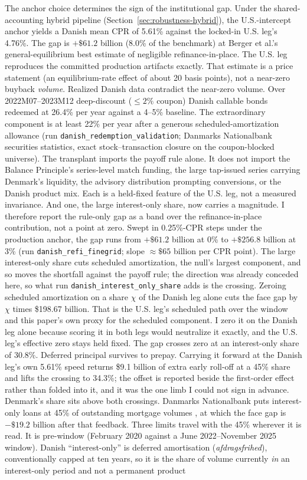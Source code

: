 \documentclass[12pt]{article}
\begin{document}
The anchor choice determines the sign of the institutional gap. Under the shared-accounting hybrid pipeline (Section~\ref{sec:robustness-hybrid}), the U.S.-intercept anchor yields a Danish mean CPR of 5.61\% against the locked-in U.S. leg's 4.76\%. The gap is $+\$61.2$ billion (8.0\% of the benchmark) at Berger et al.'s general-equilibrium best estimate of negligible refinance-in-place. The U.S. leg reproduces the committed production artifacts exactly. That estimate is a price statement (an equilibrium-rate effect of about 20 basis points), not a near-zero buyback \emph{volume}. Realized Danish data contradict the near-zero volume. Over 2022M07--2023M12 deep-discount ($\leq 2\%$ coupon) Danish callable bonds redeemed at 26.4\% per year against a 4--5\% baseline. The extraordinary component is at least 22\% per year after a generous scheduled-amortization allowance (run \texttt{danish\_redemption\_validation}; Danmarks Nationalbank securities statistics, exact stock--transaction closure on the coupon-blocked universe). The transplant imports the payoff rule alone. It does not import the Balance Principle's series-level match funding, the large tap-issued series carrying Denmark's liquidity, the advisory distribution prompting conversions, or the Danish product mix. Each is a held-fixed feature of the U.S. leg, not a measured invariance. And one, the large interest-only share, now carries a magnitude. I therefore report the rule-only gap as a band over the refinance-in-place contribution, not a point at zero. Swept in 0.25\%-CPR steps under the production anchor, the gap runs from $+\$61.2$ billion at 0\% to $+\$256.8$ billion at 3\% (run \texttt{danish\_refi\_finegrid}; slope $\approx \$65$ billion per CPR point). The large interest-only share cuts scheduled amortization, the null's largest component, and so moves the shortfall against the payoff rule; the direction was already conceded here, so what run \texttt{danish\_interest\_only\_share} adds is the crossing. Zeroing scheduled amortization on a share $\chi$ of the Danish leg alone cuts the face gap by $\chi$ times \$198.67 billion. That is the U.S. leg's scheduled path over the window and this paper's own proxy for the scheduled component. I zero it on the Danish leg alone because scoring it in both legs would neutralize it exactly, and the U.S. leg's effective zero stays held fixed. The gap crosses zero at an interest-only share of 30.8\%. Deferred principal survives to prepay. Carrying it forward at the Danish leg's own 5.61\% speed returns \$9.1 billion of extra early roll-off at a 45\% share and lifts the crossing to 34.3\%; the offset is reported beside the first-order effect rather than folded into it, and it was the one limb I could not sign in advance. Denmark's share sits above both crossings. Danmarks Nationalbank puts interest-only loans at 45\% of outstanding mortgage volumes \citep{nationalbanken2020}, at which the face gap is $-\$19.2$ billion after that feedback. Three limits travel with the 45\% wherever it is read. It is pre-window (February 2020 against a June 2022--November 2025 window). Danish ``interest-only'' is deferred amortisation (\emph{afdragsfrihed}), conventionally capped at ten years, so it is the share of volume currently \emph{in} an interest-only period and not a permanent product 
\end{document}

